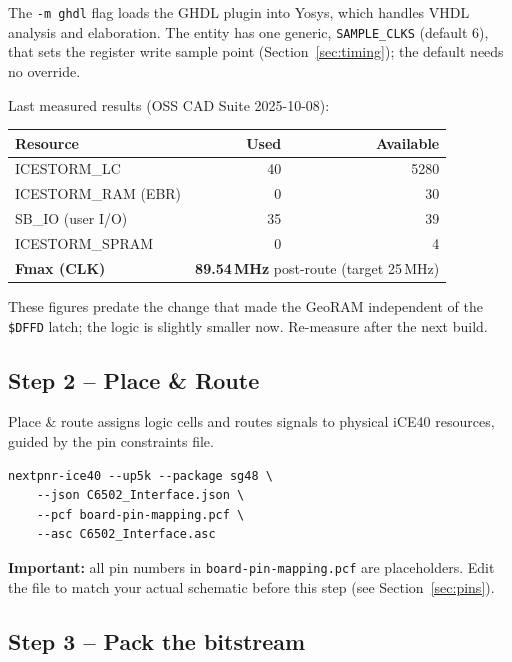 \documentclass[11pt,a4paper]{article}
\newcommand{\cmd}[1]{\texttt{#1}}
\newcommand{\file}[1]{\texttt{#1}}
\newcommand{\hex}[1]{\texttt{\$#1}}
\begin{document}
The \cmd{-m ghdl} flag loads the GHDL plugin into Yosys, which handles
VHDL analysis and elaboration.  The entity has one generic,
\cmd{SAMPLE\_CLKS} (default 6), that sets the register write sample point
(Section~\ref{sec:timing}); the default needs no override.

Last measured results (OSS CAD Suite 2025-10-08):

\begin{center}
\begin{tabular}{lrr}
\toprule
\textbf{Resource} & \textbf{Used} & \textbf{Available} \\
\midrule
ICESTORM\_LC          &  40 & 5280 \\
ICESTORM\_RAM (EBR)   &   0 &   30 \\
SB\_IO (user I/O)     &  35 &   39 \\
ICESTORM\_SPRAM       &   0 &    4 \\
\midrule
\textbf{Fmax (CLK)}   & \multicolumn{2}{l}{\textbf{89.54\,MHz} post-route (target 25\,MHz)} \\
\bottomrule
\end{tabular}
\end{center}

These figures predate the change that made the GeoRAM independent of the
\hex{DFFD} latch; the logic is slightly smaller now.  Re-measure after the
next build.

\subsection{Step 2 -- Place \& Route}

Place \& route assigns logic cells and routes signals to physical
iCE40 resources, guided by the pin constraints file.

\begin{lstlisting}[style=shell,caption={Place \& route with nextpnr-ice40}]
nextpnr-ice40 --up5k --package sg48 \
    --json C6502_Interface.json \
    --pcf board-pin-mapping.pcf \
    --asc C6502_Interface.asc
\end{lstlisting}

\textbf{Important:} all pin numbers in \file{board-pin-mapping.pcf} are
placeholders.  Edit the file to match your actual schematic before this
step (see Section~\ref{sec:pins}).

\subsection{Step 3 -- Pack the bitstream}
\end{document}

